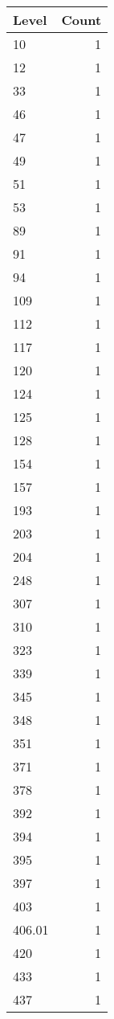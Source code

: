 \begin{table}[ht]
\centering
\begin{tabular}{lr}
  \hline
Level & Count \\ 
  \hline
10 &   1 \\ 
  12 &   1 \\ 
  33 &   1 \\ 
  46 &   1 \\ 
  47 &   1 \\ 
  49 &   1 \\ 
  51 &   1 \\ 
  53 &   1 \\ 
  89 &   1 \\ 
  91 &   1 \\ 
  94 &   1 \\ 
  109 &   1 \\ 
  112 &   1 \\ 
  117 &   1 \\ 
  120 &   1 \\ 
  124 &   1 \\ 
  125 &   1 \\ 
  128 &   1 \\ 
  154 &   1 \\ 
  157 &   1 \\ 
  193 &   1 \\ 
  203 &   1 \\ 
  204 &   1 \\ 
  248 &   1 \\ 
  307 &   1 \\ 
  310 &   1 \\ 
  323 &   1 \\ 
  339 &   1 \\ 
  345 &   1 \\ 
  348 &   1 \\ 
  351 &   1 \\ 
  371 &   1 \\ 
  378 &   1 \\ 
  392 &   1 \\ 
  394 &   1 \\ 
  395 &   1 \\ 
  397 &   1 \\ 
  403 &   1 \\ 
  406.01 &   1 \\ 
  420 &   1 \\ 
  433 &   1 \\ 
  437 &   1 \\ 

\end{tabular}
\end{table}
